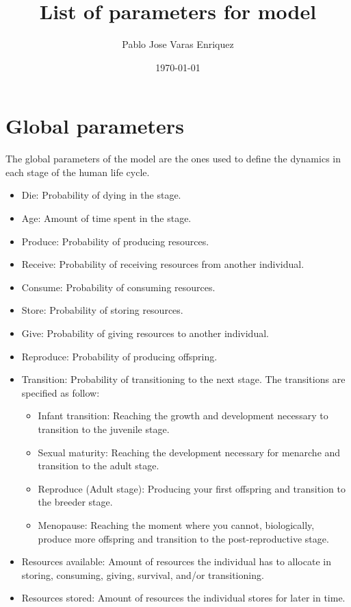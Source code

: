 \documentclass{article}
\title{List of parameters for model}
\author{Pablo Jose Varas Enriquez}
\date{\today}
\begin{document}
\maketitle

\section{Global parameters}

The global parameters of the model are the ones used to define the dynamics in each stage of the human life cycle.

\begin{itemize}
    \item Die: Probability of dying in the stage.
    \item Age: Amount of time spent in the stage.
    \item Produce: Probability of producing resources.
    \item Receive: Probability of receiving resources from another individual.
    \item Consume: Probability of consuming resources.
    \item Store: Probability of storing resources.
    \item Give: Probability of giving resources to another individual.
    \item Reproduce: Probability of producing offspring.
    \item Transition: Probability of transitioning to the next stage. The transitions are specified as follow:
    \begin{itemize}
        \item Infant transition: Reaching the growth and development necessary to transition to the juvenile stage.
        \item Sexual maturity: Reaching the development necessary for menarche and transition to the adult stage.
        \item Reproduce (Adult stage): Producing your first offspring and transition to the breeder stage.
        \item Menopause: Reaching the moment where you cannot, biologically, produce more offspring and transition to the post-reproductive stage.
    \end{itemize}
    \item Resources available: Amount of resources the individual has to allocate in storing, consuming, giving, survival, and/or transitioning.
    \item Resources stored: Amount of resources the individual stores for later in time.
\end{itemize}
\end{document}
